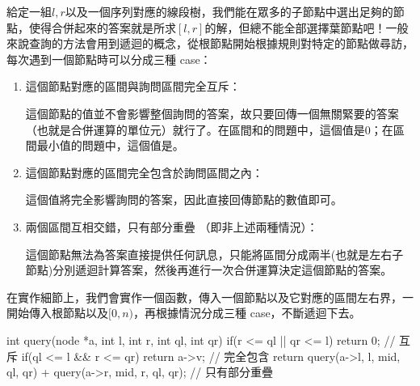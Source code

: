 \documentclass[main.tex]{subfiles}
\begin{document}
\begin{center}

\end{center}

給定一組$l, r$以及一個序列對應的線段樹，我們能在眾多的子節點中選出足夠的節點，使得合併起來的答案就是所求$[l,r]$的解，但總不能全部選擇葉節點吧！一般來說查詢的方法會用到遞迴的概念，從根節點開始根據規則對特定的節點做尋訪，每次遇到一個節點時可以分成三種 case：

\begin{enumerate}
\item 這個節點對應的區間與詢問區間完全互斥：

這個節點的值並不會影響整個詢問的答案，故只要回傳一個無關緊要的答案（也就是合併運算的單位元）就行了。在區間和的問題中，這個值是0；在區間最小值的問題中，這個值是。

\item 這個節點對應的區間完全包含於詢問區間之內：

這個值將完全影響詢問的答案，因此直接回傳節點的數值即可。

\item 兩個區間互相交錯，只有部分重疊 （即非上述兩種情況）：

這個節點無法為答案直接提供任何訊息，只能將區間分成兩半(也就是左右子節點)分別遞迴計算答案，然後再進行一次合併運算決定這個節點的答案。
\end{enumerate}

在實作細節上，我們會實作一個函數，傳入一個節點以及它對應的區間左右界，一開始傳入根節點以及$[0, n)$，再根據情況分成三種 case，不斷遞迴下去。 \\

\begin{C++}
int query(node *a, int l, int r, int ql, int qr){
	  if(r <= ql || qr <= l) return 0; // 互斥
	  if(ql <= l && r <= qr) return a->v; // 完全包含
	  return query(a->l, l, mid, ql, qr) + 
    		   query(a->r, mid, r, ql, qr); // 只有部分重疊
}
\end{C++}
\end{document}

